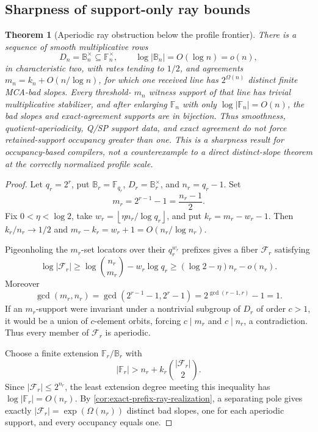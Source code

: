 \documentclass[11pt,a4paper]{amsart}
\numberwithin{equation}{section}
\newtheorem{theorem}{Theorem}[section]
\theoremstyle{remark}
\newcommand{\F}{\mathbb F}
\newcommand{\B}{\mathbb B}
\newcommand{\Fcal}{\mathcal F}
\newcommand{\abs}[1]{\lvert #1\rvert}
\newcommand{\floor}[1]{\left\lfloor #1\right\rfloor}
\begin{document}
\subsection{Sharpness of support-only ray bounds}
\begin{theorem}[Aperiodic ray obstruction below the profile frontier]
\label{thm:aperiodic-ray-obstruction}
There is a sequence of smooth multiplicative rows
\[
 D_n=\B_n^\times\subseteq\F_n^\times,
 \qquad \log\abs{\B_n}=O(\log n)=o(n),
\]
in characteristic two, with rates tending to \(1/2\), and agreements
\(m_n=k_n+O(n/\log n)\), for which one received line has
\(2^{\Omega(n)}\) distinct finite MCA-bad slopes.  Every threshold-
\(m_n\) witness support of that line has trivial multiplicative
stabilizer, and after enlarging \(\F_n\) with only
\(\log\abs{\F_n}=O(n)\), the bad slopes and exact-agreement supports are
in bijection.  Thus smoothness, quotient-aperiodicity, Q/SP support data,
and exact agreement do not force retained-support occupancy greater than
one.  This is a sharpness result for occupancy-based compilers, not a
counterexample to a direct distinct-slope theorem at the correctly
normalized profile scale.
\end{theorem}

\begin{proof}
Let \(q_r=2^r\), put \(\B_r=\F_{q_r}\),
\(D_r=\B_r^\times\), and \(n_r=q_r-1\).  Set
\[
 m_r=2^{r-1}-1=\frac{n_r-1}{2}.
\]
Fix \(0<\eta<\log2\), take
\(w_r=\floor{\eta n_r/\log q_r}\), and put
\(k_r=m_r-w_r-1\).  Then \(k_r/n_r\to1/2\) and
\(m_r-k_r=w_r+1=O(n_r/\log n_r)\).

Pigeonholing the \(m_r\)-set locators over their \(q_r^{w_r}\) prefixes
gives a fiber \(\Fcal_r\) satisfying
\[
 \log\abs{\Fcal_r}
 \ge \log\binom{n_r}{m_r}-w_r\log q_r
 \ge(\log2-\eta)n_r-o(n_r).
\]
Moreover
\[
 \gcd(m_r,n_r)=
 \gcd(2^{r-1}-1,2^r-1)=2^{\gcd(r-1,r)}-1=1.
\]
If an \(m_r\)-support were invariant under a nontrivial subgroup of
\(D_r\) of order \(c>1\), it would be a union of \(c\)-element orbits,
forcing \(c\mid m_r\) and \(c\mid n_r\), a contradiction.  Thus every
member of \(\Fcal_r\) is aperiodic.

Choose a finite extension \(\F_r/\B_r\) with
\[
 \abs{\F_r}>n_r+k_r\binom{\abs{\Fcal_r}}2.
\]
Since \(\abs{\Fcal_r}\le2^{n_r}\), the least extension degree meeting
this inequality has \(\log\abs{\F_r}=O(n_r)\).  By
\cref{cor:exact-prefix-ray-realization}, a separating pole gives exactly
\(\abs{\Fcal_r}=\exp(\Omega(n_r))\) distinct bad slopes, one for each
aperiodic support, and every occupancy equals one.
\end{proof}
\end{document}
